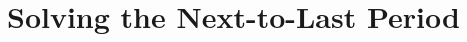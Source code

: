 \documentclass[titlepage, headings=optiontotocandhead]{\econtex}
\begin{document}

\hypertarget{Solving-the-Next-To-Last-Period}{}\section{Solving the Next-to-Last Period}\label{sec:NextToLast}
\end{document}
